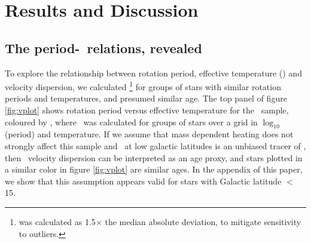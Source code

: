 \section{Results and Discussion}
\label{sec:results}

\subsection{The period-\teff\ relations, revealed}
\label{sec:the_reveal}

To explore the relationship between rotation period, effective temperature
(\teff ) and velocity dispersion, we calculated \sigmavb \footnote{\sigmavb
was calculated as 1.5$\times$ the median absolute deviation, to mitigate
sensitivity to outliers.} for groups of stars with similar rotation periods
and temperatures, and presumed similar age.
The top panel of figure \ref{fig:vplot} shows rotation period versus effective
temperature for the \mct\ sample, coloured by \sigmavb, where \sigmavb\ was
calculated for groups of stars over a grid in $\log_{10}$(period) and
temperature.
If we assume that mass dependent heating does not strongly affect this sample
and \vb\ at low galactic latitudes is an unbiased tracer of \vz, then \vb\
velocity dispersion can be interpreted as an age proxy, and stars plotted in a
similar color in figure \ref{fig:vplot} are similar ages.
In the appendix of this paper, we show that this assumption appears valid for
stars with Galactic latitude $<$ 15\degrees.
